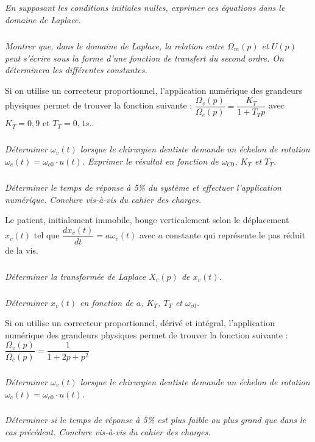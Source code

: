 \documentclass[10pt,fleqn]{article} %
\begin{document}
\begin{multicols}{2}
\subparagraph{}
\textit{En supposant les conditions initiales nulles, exprimer ces équations dans le domaine de Laplace.}

\subparagraph{}
\textit{Montrer que, dans le domaine de Laplace, la relation entre $\Omega_m(p)$ et $U(p)$ peut s'écrire sous la forme d'une fonction de transfert du second ordre. On déterminera les différentes constantes.}

Si on utilise un correcteur proportionnel, l'application numérique des grandeurs physiques permet de trouver la fonction suivante : $\dfrac{\Omega_v(p)}{\Omega_c(p)} =\dfrac{K_T}{1+T_T p}$ avec $K_T=0,9$ et $T_T=0,1 s.$.

\subparagraph{}
\textit{Déterminer $\omega_v(t)$ lorsque le chirurgien dentiste demande un échelon de rotation $\omega_c(t)=\omega_{c0}\cdot u(t)$. Exprimer le résultat en fonction de $\omega_{C0}$, $K_T$ et $T_T$.}

\subparagraph{}
\textit{Déterminer le temps de réponse à 5\% du système et effectuer l'application numérique. Conclure vis-à-vis du cahier des charges.}

Le patient, initialement immobile, bouge verticalement selon le déplacement $x_v(t)$ tel que $\dfrac{dx_v(t)}{dt} = a\omega_v(t)$ avec $a$ constante qui représente le pas réduit de la vis. 

\subparagraph{}
\textit{Déterminer la transformée de Laplace $X_v(p)$ de $x_v(t)$.}

\subparagraph{}
\textit{Déterminer $x_v(t)$ en fonction de $a$, $K_T$, $T_T$ et $\omega_{c0}$.}


Si on utilise un correcteur proportionnel, dérivé et intégral, l'application numérique des grandeurs physiques permet de trouver la fonction suivante : $\dfrac{\Omega_v(p)}{\Omega_c(p)} = \dfrac{1}{1+2p+p^2}
$

\subparagraph{}
\textit{Déterminer $\omega_v(t)$ lorsque le chirurgien dentiste demande un échelon de rotation $\omega_c(t)=\omega_{c0}\cdot u(t)$.}

\subparagraph{}
\textit{Déterminer si le temps de réponse à 5\% est plus faible  ou plus grand que dans le cas précédent. Conclure vis-à-vis du cahier des charges.}

\end{multicols}
\end{document}
